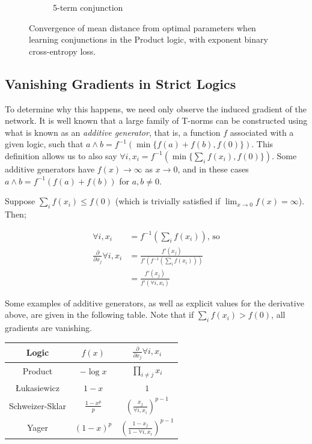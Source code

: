 \begin{figure}[h]
\begin{subfigure}[b]{0.48\textwidth}
        \caption{5-term conjunction}
        \label{fig:conjconvnokeepn5bce}
    \end{subfigure}
       \caption{Convergence of mean distance from optimal parameters when learning conjunctions in the Product logic, with exponent binary cross-entropy loss.}
       \label{fig:conjconvnokeepnbce}
\end{figure}

\subsection{Vanishing Gradients in Strict Logics}
\label{section:prodvanishgradient}

To determine why this happens, we need only observe the induced gradient of the network. It is well known that a large family of T-norms can be constructed using what is known as an \textit{additive generator}, that is, a function $f$ associated with a given logic, such that $a \land b = f^{-1}(\min\{f(a) + f(b),f(0)\})$. This definition allows us to also say $\forall i, x_i = f^{-1}(\min\{\sum_i f(x_i),f(0)\})$. Some additive generators have $f(x) \rightarrow \infty$ as $x \rightarrow 0$, and in these cases $a \land b = f^{-1}(f(a) + f(b))$ for $a, b \neq 0$.

Suppose $\sum_i f(x_i) \leq f(0)$ (which is trivially satisfied if $\lim_{x\rightarrow 0}f(x) = \infty$). Then;

$$
\begin{aligned}
\forall i, x_i 
&= f^{-1}(\sum_i f(x_i)) \text{, so} \\
\frac{\partial}{\partial x_j} \forall i, x_i 
&= \frac{
f'(x_j)
}{
f'(f^{-1}(\sum_i f(x_i)))
} \\
&= \frac{
f'(x_j)
}{
f'(\forall i, x_i )
}
\end{aligned}
$$

Some examples of additive generators, as well as explicit values for the derivative above, are given in the following table. Note that if $\sum_i f(x_i) > f(0)$, all gradients are vanishing.

\begin{center}
    \begin{tabular}{ c | c c }
        Logic & $f(x)$ & $\frac{\partial}{\partial x_j} \forall i, x_i$ \\    
        \hline
        Product 
        & $-\log x$
        & $\prod_{i \neq j} x_i$ \\
        Łukasiewicz
        & $1 - x$ 
        & $1$ \\
        Schweizer-Sklar
        & $\frac{1-x^p}{p}$ 
        & $\left(\frac{x_j}{\forall i, x_i}\right)^{p-1}$ \\
        Yager
        & $(1-x)^p$ 
        & $\left(\frac{1-x_j}{1-\forall i, x_i}\right)^{p-1}$ \\
    \end{tabular}
\end{center}

